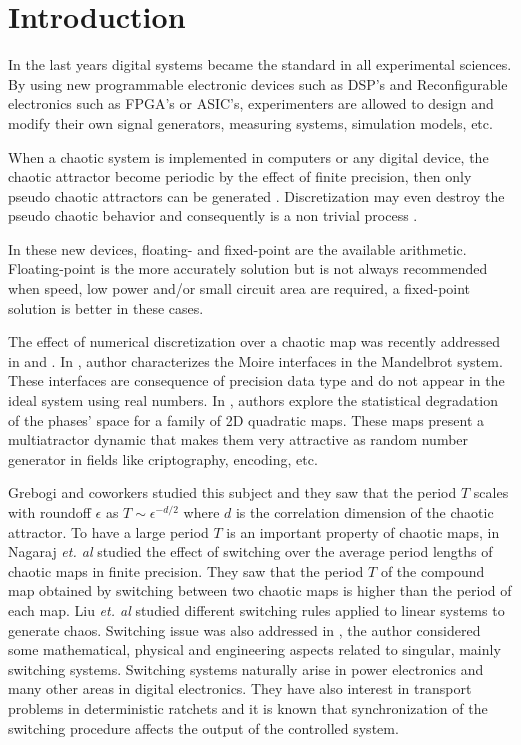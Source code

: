 \section{Introduction} \label{sec:intro}

In the last years digital systems became the standard in all experimental sciences.
By using new programmable electronic devices such as DSP's and Reconfigurable electronics such as FPGA's or ASIC's, experimenters are allowed to design and modify their own signal generators, measuring systems, simulation models, etc.

When a chaotic system is implemented in computers or any digital device, the chaotic attractor become periodic by the effect of finite precision, then only pseudo chaotic attractors can be generated \cite{Alcover2017,Dias2011}.
Discretization may even destroy the pseudo chaotic behavior and consequently is a non trivial process \cite{Azzaz2013,Hoover2017,DeMicco2017}.

In these new devices, floating- and fixed-point are the available arithmetic.
Floating-point is the more accurately solution but is not always recommended when speed, low power and/or small circuit area are required, a fixed-point solution is better in these cases.

The effect of numerical discretization over a chaotic map was recently addressed in \cite{Alcover2017} and \cite{DeMicco2017}.
In \cite{Alcover2017}, author characterizes the Moire interfaces in the Mandelbrot system.
These interfaces are consequence of precision data type and do not appear in the ideal system using real numbers.
In \cite{DeMicco2017}, authors explore the statistical degradation of the phases' space for a family of 2D quadratic maps.
These maps present a multiatractor dynamic that makes them very attractive as random number generator in fields like criptography, encoding, etc.


Grebogi and coworkers \cite{Grebogi1988} studied this subject and they saw that the period $T$ scales with roundoff $\epsilon$ as $T\sim\epsilon^{-d/2}$ where $d$ is the correlation dimension of the chaotic attractor.
To have a large period $T$ is an important property of chaotic maps, in \cite{Nagaraj2008} Nagaraj \textit{et. al} studied the effect of switching over the average period lengths of chaotic maps in finite precision.
They saw that the period $T$ of the compound map obtained by switching between two chaotic maps is higher than the period of each map.
Liu \textit{et. al} \cite{Liu2006} studied different switching rules applied to linear systems to generate chaos.
Switching issue was also addressed in \cite{Gluskin2008}, the author considered some mathematical, physical and engineering aspects related to singular, mainly switching systems.
Switching systems naturally arise in power electronics and many other areas in digital electronics.
They have also interest in transport problems in deterministic ratchets \cite{Zarlenga2009} and it is known that synchronization of the switching procedure affects the output of the controlled system.

